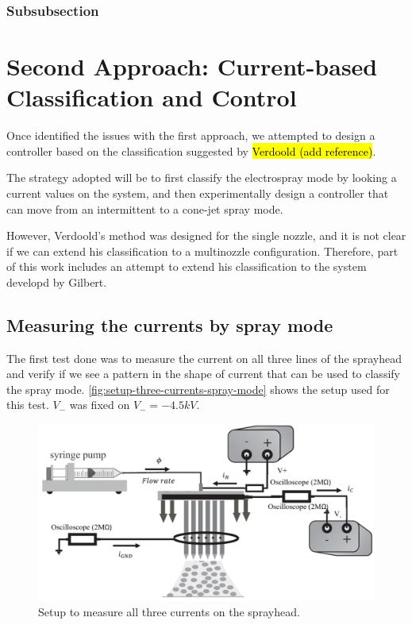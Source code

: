 \documentclass[oneside,12pt]{article}
\begin{document}
\subsubsection{Subsubsection}

\blindtext %

\section{Second Approach: Current-based Classification and Control} 

Once identified the issues with the first approach, we attempted to design a 
controller based on the classification suggested by \hl{Verdoold (add reference)}.

The strategy adopted will be to first classify the electrospray mode by looking a current values 
on the system, and then experimentally design a controller that can move from an intermittent
to a cone-jet spray mode.

However, Verdoold's method was designed for the single nozzle, and it is not clear if we can 
extend his classification to a multinozzle configuration. Therefore, part of this work 
includes an attempt to extend his classification to the system developd by 
Gilbert.


\subsection{Measuring the currents by spray mode}

The first test done was to measure the current on all three lines of the sprayhead and 
verify if we see a pattern in the shape of current that can be used to classify the spray mode.
\autoref{fig:setup-three-currents-spray-mode} shows the setup used for this test. $V_-$ was fixed on 
$V_- = - 4.5 kV$.

\begin{figure}[h!]
    \centering
    \includegraphics[width=.8\textwidth,trim=1 1 1 1,clip]{figures/setup-three-currents-spray-mode.png}
    \caption{Setup to measure all three currents on the sprayhead.}
    \label{fig:setup-three-currents-spray-mode}
\end{figure}
\end{document}
